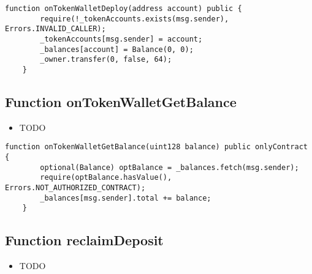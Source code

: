 \begin{lstlisting}[firstnumber=237]
    function onTokenWalletDeploy(address account) public {
        require(!_tokenAccounts.exists(msg.sender), Errors.INVALID_CALLER);
        _tokenAccounts[msg.sender] = account;
        _balances[account] = Balance(0, 0);
        _owner.transfer(0, false, 64);
    }
\end{lstlisting}

\subsection{Function onTokenWalletGetBalance}

\begin{itemize}
\item TODO
\end{itemize}

\begin{lstlisting}[firstnumber=222]
    function onTokenWalletGetBalance(uint128 balance) public onlyContract {
        optional(Balance) optBalance = _balances.fetch(msg.sender);
        require(optBalance.hasValue(), Errors.NOT_AUTHORIZED_CONTRACT);
        _balances[msg.sender].total += balance;
    }
\end{lstlisting}

\subsection{Function reclaimDeposit}

\begin{itemize}
\item TODO
\end{itemize}

